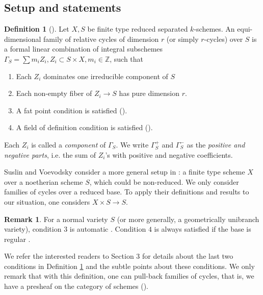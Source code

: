 \documentclass{amsart}
\theoremstyle{definition}
\newtheorem{defn}[theorem]{Definition}
\newtheorem{rem}[theorem]{Remark}
\theoremstyle{remark}
\newcommand{\mbb}{\mathbb}
\newcommand{\ZZ}{\mbb{Z}}
\begin{document}
\subsection{Setup and statements}
\begin{defn}[{\cite[Definition 3.1.3, Lemma 3.3.9]{SV_Chow_Sheaves}}]\label{def:RelCycle}
Let $X, S$ be finite type reduced separated $k$-schemes. An equi-dimensional family of relative cycles of dimension $r$ (or simply $r$-cycles) over $S$ is a formal linear combination of integral subschemes $\Gamma_S=\sum m_i Z_i, Z_i \subset S \times X, m_i \in \ZZ$, such that 
\begin{enumerate}
\item Each $Z_i$ dominates one irreducible component of $S$
\item Each non-empty fiber of $Z_i \to S$ has pure dimension $r$.
\item A fat point condition is satisfied (\cite[Definition 3.1.3]{SV_Chow_Sheaves}).
\item A field of definition condition is satisfied (\cite[Lemma 3.3.9 and the ensuing paragraph]{SV_Chow_Sheaves}). 
\end{enumerate} 
Each $Z_i$ is called a \emph{component} of $\Gamma_S$.
We write $\Gamma_{S}^+$ and $\Gamma_{S}^-$ as the \emph{positive and negative parts}, i.e. the sum of $Z_i$'s with positive and negative coefficients. 
\end{defn}

Suslin and Voevodsky consider a more general setup in \cite{SV_Chow_Sheaves}: a finite type scheme $X$ over a noetherian scheme $S$, which could be non-reduced. We only consider families of cycles over a reduced base. To apply their definitions and results to our situation, one considers $X \times S \to S$.

\begin{rem}
For a normal variety $S$ (or more generally, a geometrically unibranch variety), condition $3$ is automatic \cite[Corollary 3.4.3, 3.4.4]{SV_Chow_Sheaves}. Condition $4$ is always satisfied if the base is regular \cite[Corollary 3.4.5, 3.4.6]{SV_Chow_Sheaves}. 
\end{rem}

We refer the interested readers to \cite{SV_Chow_Sheaves} Section 3 for details about the last two  conditions in Definition \ref{def:RelCycle} and the subtle points about these conditions. We only remark that with this definition, one can pull-back families of cycles, that is, we have a presheaf on the category of schemes (\cite[paragraph before Lemma 3.3.10]{SV_Chow_Sheaves}).
\end{document}
